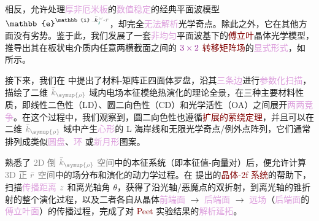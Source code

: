 相反，允许处理\textcolor{Plum}{厚非厄米板}的\textcolor{Plum}{数值稳定}的\textcolor{PineGreen}{经典平面波}模型 $\mathbb{e}^{\mathbb{i} \Xint{\begin{smallmatrix} ~ \\ {}^{}_{\mathcolor{gray}{-}} \\ ~ \end{smallmatrix}}{15}{\bar{k}}^{\;\! \mathcolor{gray}{\omega}}_{\textcolor{PineGreen}{\jmath}} \cdot \textcolor{gray}{\bar{r}}}$，却完全\textcolor{Plum}{无法解析}\textcolor{PineGreen}{光学奇点}。除此之外，它在其他方面没有劣势。鉴于此，我们发展了一套\textcolor{Plum}{非均匀}\textcolor{PineGreen}{平面波基}下的\textcolor{Maroon}{傅立叶}\textcolor{PineGreen}{晶体光学}模型\cite{xieAnalytic3DVector}，推导出其在板状电介质内任意两横截面之间的 $\textcolor{Plum}{3 \times 2}$ \textcolor{Maroon}{转移矩阵场}的\textcolor{Plum}{显式形式}，如  所示。

接下来，我们在  中提出了\textcolor{NavyBlue}{材料-矩阵正四面体罗盘}，沿其\textcolor{Plum}{三条边}进行\textcolor{Plum}{参数化扫描}，描绘了二维 $\mathcolor{gray}{\bar{k}_{\symup{\rho}}}$ 域内电场\textcolor{PineGreen}{本征模}\textcolor{NavyBlue}{绝热演化}的\textcolor{NavyBlue}{理论全景}，在三种主要材料性质，即\textcolor{NavyBlue}{线性二色性（LD）}、\textcolor{NavyBlue}{圆二向色性（CD）}和\textcolor{NavyBlue}{光学活性（OA）}之间展开\textcolor{Plum}{两两竞争}。在这个过程中，我们观察到，\textcolor{NavyBlue}{圆二向色性}也遵循\textcolor{Maroon}{扩展的萦绕定理}\cite{berryOpticalSingularitiesBirefringent2003}，并且可以在二维 $\mathcolor{gray}{\bar{k}_{\symup{\rho}}}$ 域中产生\textcolor{Plum}{心形}的 \textcolor{PineGreen}{L 海岸线}和无限\textcolor{PineGreen}{光学奇点}/\textcolor{PineGreen}{例外点}阵列，它们通常排列成类似\textcolor{Plum}{圆盘}、\textcolor{Plum}{环}\cite{kirillovUnfoldingEigenvalueSurfaces2005} 或\textcolor{Plum}{新月形}图案。

熟悉了 \textcolor{gray}{2D 倒} $\mathcolor{gray}{\bar{k}_{\symup{\rho}}}$ \textcolor{gray}{空间}中的\textcolor{PineGreen}{本征系统}（即\textcolor{PineGreen}{本征值-向量对}）后，便允许计算 \textcolor{gray}{3D 正} $\mathcolor{gray}{\bar{r}}$ \textcolor{gray}{空间}中的\textcolor{NavyBlue}{场分布和演化}的动力学过程。在  提出的\textcolor{Maroon}{晶体-2f 系统}的帮助下，扫描\textcolor{Plum}{传播距离} $\mathcolor{gray}{z}$ 和离\textcolor{PineGreen}{光轴}角 $\theta$，获得了沿\textcolor{PineGreen}{光轴}/\textcolor{PineGreen}{恶魔点}的\textcolor{PineGreen}{双折射}，到离\textcolor{PineGreen}{光轴}的\textcolor{PineGreen}{锥折射}的整个\textcolor{NavyBlue}{演化}过程，以及二者各自从晶体\textcolor{Plum}{前端面} $\longrightarrow$ \textcolor{Plum}{后端面} $\longrightarrow$ \textcolor{Plum}{远场}（\textcolor{Plum}{后端面}的\textcolor{Plum}{傅立叶面}）的\textcolor{NavyBlue}{传播过程}，完成了对 \textcolor{Maroon}{Peet} 实验结果的\textcolor{Plum}{解析延拓}。


